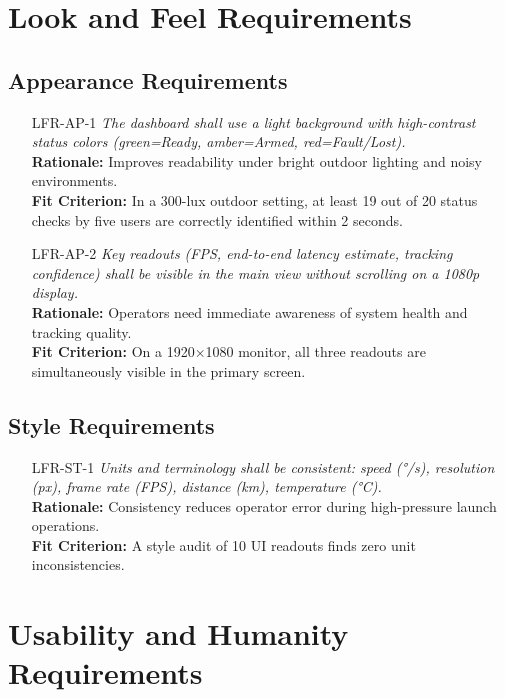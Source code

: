 \documentclass[12pt]{article}
\begin{document}
\section{Look and Feel Requirements}
\subsection{Appearance Requirements}
\begin{itemize}[leftmargin=*]
  \item[LFR-AP-1] \emph{The dashboard shall use a light background with high-contrast
          status colors (green=Ready, amber=Armed, red=Fault/Lost).}\\
        \textbf{Rationale:} Improves readability under bright outdoor lighting and
        noisy environments.\\ \textbf{Fit Criterion:} In a 300-lux outdoor setting, at
        least 19 out of 20 status checks by five users are correctly identified within
        2 seconds.

  \item[LFR-AP-2] \emph{Key readouts (FPS, end-to-end latency estimate, tracking
          confidence) shall be visible in the main view without scrolling on a 1080p
          display.}\\ \textbf{Rationale:} Operators need immediate awareness of system
        health and tracking quality.\\ \textbf{Fit Criterion:} On a 1920×1080 monitor,
        all three readouts are simultaneously visible in the primary screen.
\end{itemize}

\subsection{Style Requirements}
\begin{itemize}[leftmargin=*]
  \item[LFR-ST-1] \emph{Units and terminology shall be consistent: speed (°/s),
          resolution (px), frame rate (FPS), distance (km), temperature (°C).}\\
        \textbf{Rationale:} Consistency reduces operator error during high-pressure
        launch operations.\\ \textbf{Fit Criterion:} A style audit of 10 UI readouts
        finds zero unit inconsistencies.
\end{itemize}

\section{Usability and Humanity Requirements}
\end{document}
